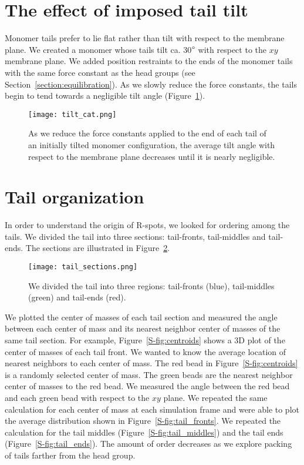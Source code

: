   \section{The effect of imposed tail tilt}\label{S-section:tail_tilt}
  
  Monomer tails prefer to lie flat rather than tilt with respect to the
  membrane plane. We created a monomer whose tails tilt ca. 30$\degree$ with
  respect to the $xy$ membrane plane.  We added position restraints to the ends
  of the monomer tails with the same force constant as the head groups (see
  Section~\ref{section:equilibration}).  As we slowly reduce the force constants,
  the tails begin to tend towards a negligible tilt angle
  (Figure~\ref{S-fig:tail_tilt}).
  
  \begin{figure}[!htb]
  \centering
  \texttt{[image: tilt\_cat.png]}
  \caption{As we reduce the force constants applied to the end of each
  tail of an initially tilted monomer configuration, the average tilt 
  angle with respect to the membrane plane decreases until it is nearly
  negligible.}\label{S-fig:tail_tilt}
  \end{figure}

  \section{Tail organization}\label{S-section:tail_packing}
  
  In order to understand the origin of R-spots, we looked for ordering among
  the tails. We divided the tail into three sections: tail-fronts, tail-middles
  and tail-ends. The sections are illustrated in Figure~\ref{S-fig:tail_sections}.
  
  \begin{figure}[!htb]
  \centering
  \texttt{[image: tail\_sections.png]}
  \caption{We divided the tail into three regions: tail-fronts (blue), 
  tail-middles (green) and tail-ends (red).}\label{S-fig:tail_sections}
  \end{figure}
  
  We plotted the center of masses of each tail section and measured the angle 
  between each center of mass and its nearest neighbor center of masses of the
  same tail section. For example, Figure~\ref{S-fig:centroids} shows a 3D plot of
  the center of masses of each tail front. We wanted to know the average location
  of nearest neighbors to each center of mass. The red bead in 
  Figure~\ref{S-fig:centroids} is a randomly selected center of mass. The
  green beads are the nearest neighbor center of masses to the red bead. We
  measured the angle between the red bead and each green bead with respect to
  the $xy$ plane. We repeated the same calculation for each center of mass at
  each simulation frame and were able to plot the average distribution shown
  in Figure~\ref{S-fig:tail_fronts}. We repeated the calculation for the tail
  middles (Figure~\ref{S-fig:tail_middles}) and the tail ends 
  (Figure~\ref{S-fig:tail_ends}). The amount of order decreases as we explore
  packing of tails farther from the head group.

